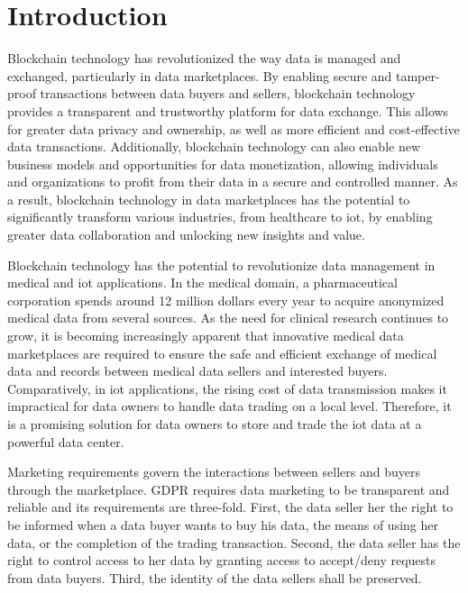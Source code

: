 \section{Introduction}
\label{sec:introduction}

Blockchain technology has revolutionized the way data is managed and exchanged, particularly in data marketplaces.
By enabling secure and tamper-proof transactions between data buyers and sellers, blockchain technology provides a transparent and trustworthy platform for data exchange.
This allows for greater data privacy and ownership, as well as more efficient and cost-effective data transactions.
Additionally, blockchain technology can also enable new business models and opportunities for data monetization, allowing individuals and organizations to profit from their data in a secure and controlled manner.
As a result, blockchain technology in data marketplaces has the potential to significantly transform various industries, from healthcare to \ac{iot}, by enabling greater data collaboration and unlocking new insights and value.

Blockchain technology has the potential to revolutionize data management in medical and \ac{iot} applications.
In the medical domain, a pharmaceutical corporation spends around 12 million dollars every year to acquire anonymized medical data from several sources.
As the need for clinical research continues to grow, it is becoming increasingly apparent that innovative medical data marketplaces are required to ensure the safe and efficient exchange of medical data and records between medical data sellers and interested buyers.
Comparatively, in \ac{iot} applications, the rising cost of data transmission makes it impractical for data owners to handle data trading on a local level.
Therefore, it is a promising solution for data owners to store
and trade the \ac{iot} data at a powerful data center.

Marketing requirements govern the interactions between sellers and buyers through the marketplace.
GDPR requires data marketing to be transparent and reliable and its requirements are three-fold.
First, the data seller her the right to be informed when a data buyer wants to buy his data, the means of using  her data, or the completion of the trading transaction.
Second, the data seller has the right to control access to her data by granting access to accept/deny requests from data buyers.
Third, the identity of the data sellers shall be preserved.

